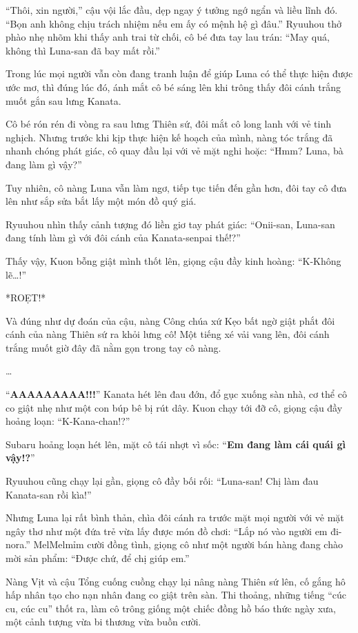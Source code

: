 \documentclass[../main.tex]{subfiles}
\begin{document}
``Thôi, xin người,'' cậu vội lắc đầu, dẹp ngay ý tưởng ngớ ngẩn và liều lĩnh đó. ``Bọn anh không chịu trách nhiệm nếu em ấy có mệnh hệ gì đâu.'' Ryuuhou thở phào nhẹ nhõm khi thấy anh trai từ chối, cô bé đưa tay lau trán: ``May quá, không thì Luna-san đã bay mất rồi.''

Trong lúc mọi người vẫn còn đang tranh luận để giúp Luna có thể thực hiện được ước mơ, thì đúng lúc đó, ánh mắt cô bé sáng lên khi trông thấy đôi cánh trắng muốt gắn sau lưng Kanata.


Cô bé rón rén đi vòng ra sau lưng Thiên sứ, đôi mắt cô long lanh với vẻ tinh nghịch. Nhưng trước khi kịp thực hiện kế hoạch của mình, nàng tóc trắng đã nhanh chóng phát giác, cô quay đầu lại với vẻ mặt nghi hoặc: ``Hmm? Luna, bà đang làm gì vậy?''

Tuy nhiên, cô nàng Luna vẫn làm ngơ, tiếp tục tiến đến gần hơn, đôi tay cô đưa lên như sắp sửa bắt lấy một món đồ quý giá.

Ryuuhou nhìn thấy cảnh tượng đó liền giơ tay phát giác: ``Onii-san, Luna-san đang tính làm gì với đôi cánh của Kanata-senpai thế!?''

Thấy vậy, Kuon bỗng giật mình thốt lên, giọng cậu đầy kinh hoàng: ``K-Không lẽ\dots!''

*ROẸT!*

Và đúng như dự đoán của cậu, nàng Công chúa xứ Kẹo bất ngờ giật phắt đôi cánh của nàng Thiên sứ ra khỏi lưng cô! Một tiếng xé vải vang lên, đôi cánh trắng muốt giờ đây đã nằm gọn trong tay cô nàng.

\dots

``\textbf{AAAAAAAAA!!!}'' Kanata hét lên đau đớn, đổ gục xuống sàn nhà, cơ thể cô co giật nhẹ như một con búp bê bị rút dây. Kuon chạy tới đỡ cô, giọng cậu đầy hoảng loạn: ``K-Kana-chan!?''

Subaru hoảng loạn hét lên, mặt cô tái nhợt vì sốc: ``\textbf{Em đang làm cái quái gì vậy!?}''

Ryuuhou cũng chạy lại gần, giọng cô đầy bối rối: ``Luna-san! Chị làm đau Kanata-san rồi kìa!''

Nhưng Luna lại rất bình thản, chìa đôi cánh ra trước mặt mọi người với vẻ mặt ngây thơ như một đứa trẻ vừa lấy được món đồ chơi: ``Lắp nó vào người em đi-nora.'' MelMelmỉm cười đồng tình, giọng cô như một người bán hàng đang chào mời sản phẩm: ``Được chứ, để chị giúp em.''

Nàng Vịt và cậu Tổng cuống cuồng chạy lại nâng nàng Thiên sứ lên, cố gắng hô hấp nhân tạo cho nạn nhân đang co giật trên sàn. Thi thoảng, những tiếng ``cúc cu, cúc cu'' thốt ra, làm cô trông giống một chiếc đồng hồ báo thức ngày xưa, một cảnh tượng vừa bi thương vừa buồn cười.
\end{document}
